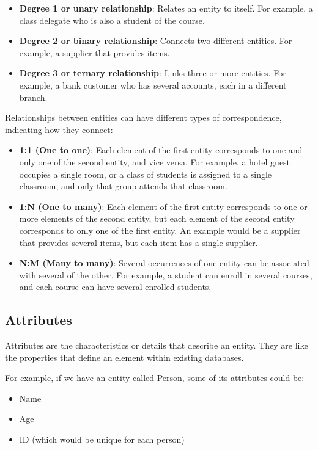 \documentclass{article}
\begin{document}
\begin{itemize}
    \item \textbf{Degree 1 or unary relationship}: Relates an entity to itself. For example, a class delegate who is also a student of the course.
    \item \textbf{Degree 2 or binary relationship}: Connects two different entities. For example, a supplier that provides items.
    \item \textbf{Degree 3 or ternary relationship}: Links three or more entities. For example, a bank customer who has several accounts, each in a different branch.
\end{itemize}

Relationships between entities can have different types of correspondence, indicating how they connect:

\begin{itemize}
    \item \textbf{1:1 (One to one)}: Each element of the first entity corresponds to one and only one of the second entity, and vice versa. For example, a hotel guest occupies a single room, or a class of students is assigned to a single classroom, and only that group attends that classroom.
    \item \textbf{1:N (One to many)}: Each element of the first entity corresponds to one or more elements of the second entity, but each element of the second entity corresponds to only one of the first entity. An example would be a supplier that provides several items, but each item has a single supplier.
    \item \textbf{N:M (Many to many)}: Several occurrences of one entity can be associated with several of the other. For example, a student can enroll in several courses, and each course can have several enrolled students.
\end{itemize}

\subsection{Attributes}

Attributes are the characteristics or details that describe an entity. They are like the properties that define an element within existing databases.

For example, if we have an entity called Person, some of its attributes could be:

\begin{itemize}
    \item Name
    \item Age
    \item ID (which would be unique for each person)
\end{itemize}
\end{document}
